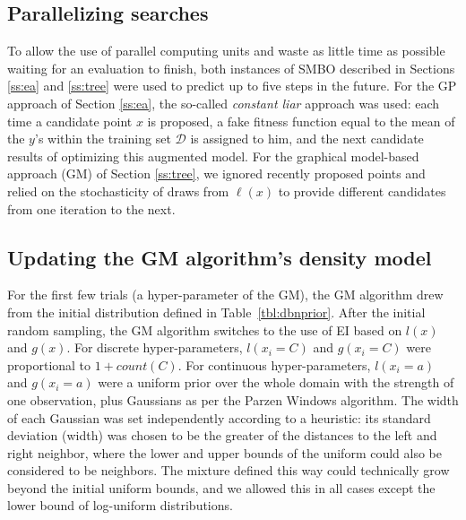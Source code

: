 \documentclass{article}
\newcommand{\vs}[1]{\vspace*{-#1mm}}
\newcommand{\Bs}{\vs{2}}
\newcommand{\Bss}{\vs{1}}
\newcommand{\ass}{\vs{0.7}}
\begin{document}
\Bss
\subsection{Parallelizing searches}
\ass

To allow the use of parallel computing units and waste as little time
as possible waiting for an evaluation to finish, both instances of
SMBO described in Sections \ref{ss:ea} and \ref{ss:tree} were used to
predict up to five steps in
the future. For the GP approach of Section \ref{ss:ea}, the so-called
{\it constant liar} approach was used: each time a candidate point $x$
is proposed, a fake fitness function equal to the mean of the $y$'s
within the training set $\mathcal{D}$ is assigned to him, and the next
candidate results of optimizing this augmented model. For the
graphical model-based approach (GM) of Section \ref{ss:tree}, we ignored recently proposed points
and relied on the stochasticity of draws from $\ell(x)$ to provide different candidates
from one iteration to the next.

\Bss
\subsection{Updating the GM algorithm's density model}
\ass

For the first few trials (a hyper-parameter of the GM),
the GM algorithm drew from the initial distribution defined in Table~\ref{tbl:dbnprior}.
After the initial random sampling, the GM algorithm switches to the use of EI based on $l(x)$ and $g(x)$.
For discrete hyper-parameters, $l(x_i=C)$ and $g(x_i=C)$ were proportional to $1+count(C)$.
For continuous hyper-parameters, $l(x_i=a)$ and $g(x_i=a)$
were a uniform prior over the whole domain with the strength of one observation,
plus Gaussians as per the Parzen Windows algorithm.
The width of each Gaussian was set independently according to a heuristic:
its standard deviation (width) was chosen to be the
greater of the distances to the left and right neighbor, 
where the lower and upper bounds of the uniform could also be considered to be neighbors.
The mixture defined this way could technically grow beyond the initial uniform bounds,
and we allowed this in all cases except the lower bound of log-uniform distributions.


\Bs
\end{document}
